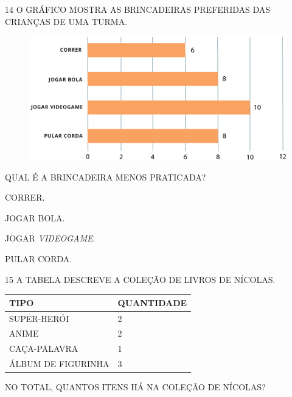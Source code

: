 \num{14} O GRÁFICO MOSTRA AS BRINCADEIRAS PREFERIDAS DAS CRIANÇAS DE UMA TURMA.

\begin{figure}[H]
\includegraphics[width=\textwidth]{./media/SAEB_1ANO_MAT_FIGURA134.png}
\end{figure}

QUAL É A BRINCADEIRA MENOS PRATICADA?

\begin{escolha}[itemsep=0pt]
\item CORRER.

\item JOGAR BOLA.

\item JOGAR \textit{VIDEOGAME}.

\item PULAR CORDA.
\end{escolha}

\num{15} A TABELA DESCREVE A COLEÇÃO DE LIVROS DE NÍCOLAS.


\begin{table}[!ht]
    \centering
    \begin{tabular}{|l|l|}
    \hline
        \textbf{TIPO} & \textbf{QUANTIDADE} \\ \hline
        SUPER-HERÓI & 2 \\ \hline
        ANIME & 2 \\ \hline
        CAÇA-PALAVRA & 1 \\ \hline
        ÁLBUM DE FIGURINHA & 3 \\ \hline
    \end{tabular}
\end{table}

NO TOTAL, QUANTOS ITENS HÁ NA COLEÇÃO DE NÍCOLAS?

